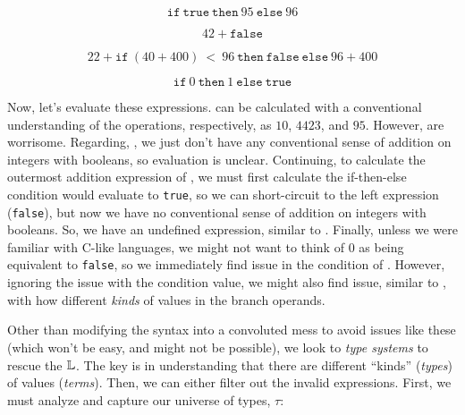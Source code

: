 \begin{equation}
      \texttt{if}\ \texttt{true}\ \texttt{then}\ 95\ \texttt{else}\ 96
      \label{ex:sl:s:good3}
\end{equation}

\begin{equation}
      42\ \texttt{+}\ \texttt{false}
      \label{ex:sl:s:bad1}
\end{equation}

\begin{equation}
      22 + \texttt{if}\ (40\ \texttt{+}\ 400)\ <\ 96\ \texttt{then}\ \texttt{false}\ \texttt{else}\ 96\ \texttt{+}\ 400
      \label{ex:sl:s:bad2}
\end{equation}

\begin{equation}
      \texttt{if}\ 0\ \texttt{then}\ 1\ \texttt{else}\ \texttt{true}
      \label{ex:sl:s:bad3}
\end{equation}


Now, let's evaluate these expressions.
 can be calculated with a
conventional understanding of the operations, respectively, as \(10\), \(4423\),
and \(95\). However,  are
worrisome. Regarding, , we just don't have any conventional
sense of addition on integers with booleans, so evaluation is unclear.
Continuing, to calculate the outermost addition expression of
, we must first calculate the if-then-else condition would
evaluate to \texttt{true}, so we can short-circuit to the left expression
(\texttt{false}), but now we have no conventional sense of addition on integers
with booleans. So, we have an undefined expression, similar to
. Finally, unless we were familiar with C-like languages, we
might not want to think of \(0\) as being equivalent to \texttt{false}, so we
immediately find issue in the condition of . However,
ignoring the issue with the condition value, we might also find issue, similar
to , with how different \textit{kinds} of values in the
branch operands.


Other than modifying the syntax into a convoluted mess to avoid issues like
these (which won't be easy, and might not be possible), we look to \textit{type
      systems} to rescue the \(\mathbb{L}\). The key is in understanding that there are
different ``kinds'' (\textit{types}) of values (\textit{terms}). Then, we can
either filter out the invalid expressions. First, we must analyze and capture
our universe of types, \(\tau\):

